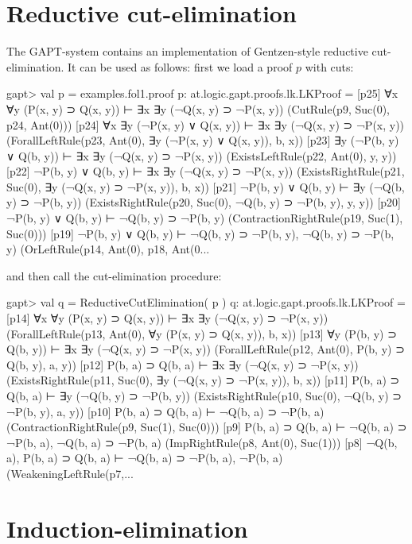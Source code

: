 \documentclass[a4paper,11pt]{book}
\begin{document}
\section{Reductive cut-elimination}

The GAPT-system contains an implementation of Gentzen-style reductive
cut-elimination.  It can be used as follows: first we load a proof $p$ with
cuts:

\begin{clilisting}
gapt> val p = examples.fol1.proof
p: at.logic.gapt.proofs.lk.LKProof =
[p25] ∀x ∀y (P(x, y) ⊃ Q(x, y)) ⊢ ∃x ∃y (¬Q(x, y) ⊃ ¬P(x, y))    (CutRule(p9, Suc(0), p24, Ant(0)))
[p24] ∀x ∃y (¬P(x, y) ∨ Q(x, y)) ⊢ ∃x ∃y (¬Q(x, y) ⊃ ¬P(x, y))    (ForallLeftRule(p23, Ant(0), ∃y (¬P(x, y) ∨ Q(x, y)), b, x))
[p23] ∃y (¬P(b, y) ∨ Q(b, y)) ⊢ ∃x ∃y (¬Q(x, y) ⊃ ¬P(x, y))    (ExistsLeftRule(p22, Ant(0), y, y))
[p22] ¬P(b, y) ∨ Q(b, y) ⊢ ∃x ∃y (¬Q(x, y) ⊃ ¬P(x, y))    (ExistsRightRule(p21, Suc(0), ∃y (¬Q(x, y) ⊃ ¬P(x, y)), b, x))
[p21] ¬P(b, y) ∨ Q(b, y) ⊢ ∃y (¬Q(b, y) ⊃ ¬P(b, y))    (ExistsRightRule(p20, Suc(0), ¬Q(b, y) ⊃ ¬P(b, y), y, y))
[p20] ¬P(b, y) ∨ Q(b, y) ⊢ ¬Q(b, y) ⊃ ¬P(b, y)    (ContractionRightRule(p19, Suc(1), Suc(0)))
[p19] ¬P(b, y) ∨ Q(b, y) ⊢ ¬Q(b, y) ⊃ ¬P(b, y), ¬Q(b, y) ⊃ ¬P(b, y)    (OrLeftRule(p14, Ant(0), p18, Ant(0...

\end{clilisting}
%
and then call the cut-elimination procedure:
\begin{clilisting}
gapt> val q = ReductiveCutElimination( p )
q: at.logic.gapt.proofs.lk.LKProof =
[p14] ∀x ∀y (P(x, y) ⊃ Q(x, y)) ⊢ ∃x ∃y (¬Q(x, y) ⊃ ¬P(x, y))    (ForallLeftRule(p13, Ant(0), ∀y (P(x, y) ⊃ Q(x, y)), b, x))
[p13] ∀y (P(b, y) ⊃ Q(b, y)) ⊢ ∃x ∃y (¬Q(x, y) ⊃ ¬P(x, y))    (ForallLeftRule(p12, Ant(0), P(b, y) ⊃ Q(b, y), a, y))
[p12] P(b, a) ⊃ Q(b, a) ⊢ ∃x ∃y (¬Q(x, y) ⊃ ¬P(x, y))    (ExistsRightRule(p11, Suc(0), ∃y (¬Q(x, y) ⊃ ¬P(x, y)), b, x))
[p11] P(b, a) ⊃ Q(b, a) ⊢ ∃y (¬Q(b, y) ⊃ ¬P(b, y))    (ExistsRightRule(p10, Suc(0), ¬Q(b, y) ⊃ ¬P(b, y), a, y))
[p10] P(b, a) ⊃ Q(b, a) ⊢ ¬Q(b, a) ⊃ ¬P(b, a)    (ContractionRightRule(p9, Suc(1), Suc(0)))
[p9] P(b, a) ⊃ Q(b, a) ⊢ ¬Q(b, a) ⊃ ¬P(b, a), ¬Q(b, a) ⊃ ¬P(b, a)    (ImpRightRule(p8, Ant(0), Suc(1)))
[p8] ¬Q(b, a), P(b, a) ⊃ Q(b, a) ⊢ ¬Q(b, a) ⊃ ¬P(b, a), ¬P(b, a)    (WeakeningLeftRule(p7,...

\end{clilisting}

\section{Induction-elimination}
\end{document}
